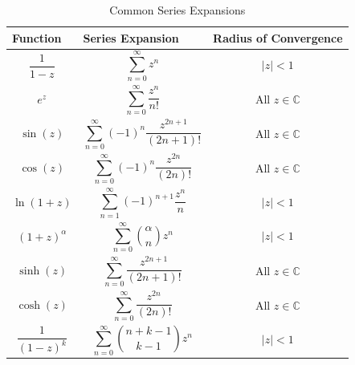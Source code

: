 \begin{table}[h!]
    \centering
    \begin{tabular}{| m{4.6cm} | m{4.6cm} | m{4.6cm}|}
        \hline
        \textbf{Function}       & \textbf{Series Expansion}                               & \textbf{Radius of Convergence}     \\ \hline
        \[\frac{1}{1 - z}\]     & \[\sum_{n=0}^{\infty} z^n\]                             & \[|z| < 1\]                        \\ \hline
        \[e^z\]                 & \[\sum_{n=0}^{\infty} \frac{z^n}{n!}\]                  & \[ \text{All } z \in \mathbb{C} \] \\ \hline
        \[\sin(z)\]             & \[\sum_{n=0}^{\infty} (-1)^n \frac{z^{2n+1}}{(2n+1)!}\] & \[\text{All } z \in \mathbb{C}\]   \\ \hline
        \[\cos(z)\]             & \[\sum_{n=0}^{\infty} (-1)^n \frac{z^{2n}}{(2n)!}\]     & \[\text{All } z \in \mathbb{C}\]   \\ \hline
        \[\ln(1 + z)\]          & \[\sum_{n=1}^{\infty} (-1)^{n+1} \frac{z^n}{n}\]        & \[|z| < 1\]                        \\ \hline
        \[(1 + z)^{\alpha}\]    & \[\sum_{n=0}^{\infty} \binom{\alpha}{n} z^n\]           & \[|z| < 1\]                        \\ \hline
        \[\sinh(z)\]            & \[\sum_{n=0}^{\infty} \frac{z^{2n+1}}{(2n+1)!}\]        & \[\text{All } z \in \mathbb{C}\]   \\ \hline
        \[\cosh(z)\]            & \[\sum_{n=0}^{\infty} \frac{z^{2n}}{(2n)!}\]            & \[\text{All } z \in \mathbb{C}\]   \\ \hline
        \[\frac{1}{(1 - z)^k}\] & \[\sum_{n=0}^{\infty} \binom{n + k - 1}{k - 1} z^n\]    & \[|z| < 1\]                        \\ \hline
    \end{tabular}
    \caption{Common Series Expansions}
\end{table}